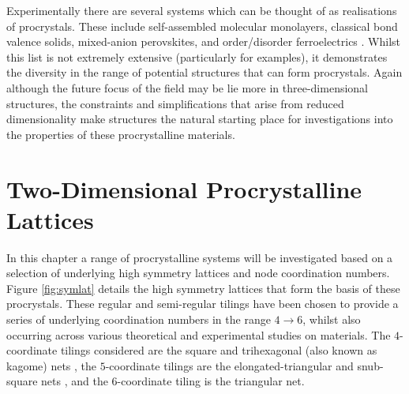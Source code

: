 Experimentally there are several systems which can be thought of as realisations of procrystals. 
These include self-assembled molecular monolayers, classical bond valence solids, mixed-anion perovskites, and order/disorder ferroelectrics \cite{Blunt2008,Anderson1973,Camp2012,Comes1968}.
Whilst this list is not extremely extensive (particularly for \td{} examples), it demonstrates the diversity in the range of potential structures that can form procrystals.
Again although the future focus of the field may be lie more in three\--dimensional structures, the constraints and simplifications that arise from reduced dimensionality make \td{} structures the natural starting place for investigations into the properties of these procrystalline materials.

\section{Two\--Dimensional Procrystalline Lattices}

In this chapter a range of \td{} procrystalline systems will be investigated based on a selection of underlying high symmetry lattices and node coordination numbers.
Figure \ref{fig:symlat} details the high symmetry lattices that form the basis of these procrystals.
These regular and semi\--regular tilings have been chosen to provide a series of underlying coordination numbers in the range $4\rightarrow6$, whilst also occurring across various theoretical and experimental studies on \td{} materials.
The $4$\--coordinate tilings considered are the square and trihexagonal (also known as kagome) nets \cite{Algara-Siller2015,Zhu2017,Hibble2011,Zheng2014,Postulka2016,Chen2011},
the $5$\--coordinate tilings are the elongated\--triangular and snub\--square nets \cite{Griffith2018,Urgel2014,Kryuchkov2018,Song2015,Pineros2016}, and the $6$\--coordinate tiling is the triangular net. 


